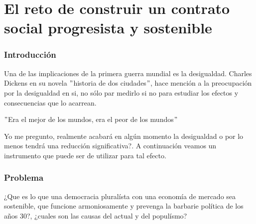 \chapter*{El reto de construir un contrato social progresista y sostenible}

\begin{multicols}{2}


\subsection*{Introducción}

Una de las implicaciones de la primera guerra mundial es la desigualdad. Charles Dickens en su novela $"$historia de dos ciudades$"$, hace mención a la preocupación por la desigualdad en si, no sólo par medirlo si no para estudiar los efectos y consecuencias que lo acarrean.
\begin{center} $"$Era el mejor de los mundos, era el peor de los mundos$"$ \end{center}
Yo me pregunto, realmente acabará en algún momento la desigualdad o por lo menos tendrá una reducción significativa?. A continuación veamos un instrumento que puede ser de utilizar para tal efecto.

\subsection*{Problema}

\begin{center}¿Que es lo que una democracia pluralísta con una economía de mercado sea sostenible, que funcione armoniosamente y prevenga la barbarie política de los años 30?, ¿cuales son las causas del actual y del populísmo?\end{center}


\end{multicols}
